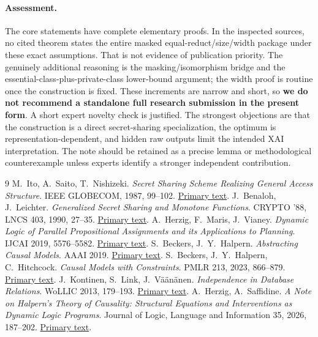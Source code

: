 \documentclass[11pt]{article}
\begin{document}
\paragraph{Assessment.}
The core statements have complete elementary proofs. In the inspected sources, no cited theorem states the entire masked equal-reduct/size/width package under these exact assumptions. That is not evidence of publication priority. The genuinely additional reasoning is the masking/isomorphism bridge and the essential-class-plus-private-class lower-bound argument; the width proof is routine once the construction is fixed. These increments are narrow and short, so \textbf{we do not recommend a standalone full research submission in the present form}. A short expert novelty check is justified. The strongest objections are that the construction is a direct secret-sharing specialization, the optimum is representation-dependent, and hidden raw outputs limit the intended XAI interpretation. The note should be retained as a precise lemma or methodological counterexample unless experts identify a stronger independent contribution.

\begin{thebibliography}{9}\small
{} M.~Ito, A.~Saito, T.~Nishizeki. \emph{Secret Sharing Scheme Realizing General Access Structure}. IEEE GLOBECOM, 1987, 99--102. \href{https://archiv.infsec.ethz.ch/education/as09/secsem/papers/ItSaNi87.pdf}{Primary text}.
 J.~Benaloh, J.~Leichter. \emph{Generalized Secret Sharing and Monotone Functions}. CRYPTO '88, LNCS 403, 1990, 27--35. \href{https://www.cs.cornell.edu/courses/cs754/2001fa/bena88.pdf}{Primary text}.
 A.~Herzig, F.~Maris, J.~Vianey. \emph{Dynamic Logic of Parallel Propositional Assignments and its Applications to Planning}. IJCAI 2019, 5576--5582. \href{https://www.ijcai.org/proceedings/2019/0774.pdf}{Primary text}.
 S.~Beckers, J.~Y.~Halpern. \emph{Abstracting Causal Models}. AAAI 2019. \href{https://www.cs.cornell.edu/home/halpern/papers/abstraction.pdf}{Primary text}.
 S.~Beckers, J.~Y.~Halpern, C.~Hitchcock. \emph{Causal Models with Constraints}. PMLR 213, 2023, 866--879. \href{https://proceedings.mlr.press/v213/beckers23a/beckers23a.pdf}{Primary text}.
 J.~Kontinen, S.~Link, J.~V\"a\"an\"anen. \emph{Independence in Database Relations}. WoLLIC 2013, 179--193. \href{https://www.mv.helsinki.fi/home/jvaanane/KonLinVaa.pdf}{Primary text}.
 A.~Herzig, A.~Saffidine. \emph{A Note on Halpern's Theory of Causality: Structural Equations and Interventions as Dynamic Logic Programs}. Journal of Logic, Language and Information 35, 2026, 187--202. \href{https://doi.org/10.1007/s10849-026-09468-w}{Primary text}.
\end{thebibliography}
\end{document}
